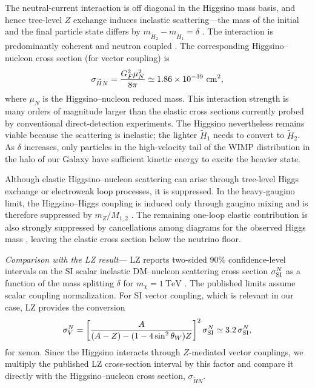 \documentclass[
aps,
prl,
reprint,
superscriptaddress,
nofootinbib,
nobibnotes
]{revtex4-2}
\begin{document}
The neutral-current interaction is off diagonal in the Higgsino mass
basis, and hence tree-level $Z$ exchange induces inelastic scattering---the mass of the initial and the final particle state differs by $m_{\widetilde{H}_2}-m_{\widetilde{H}_1}=\delta$
\cite{Tucker-Smith:2001myb}.
The interaction is predominantly coherent and neutron coupled \cite{Nagata:2014wma,Kowalska:2018toh,Essig:2007az}. 
The corresponding Higgsino--nucleon cross section (for vector coupling) is 
\begin{equation}
    \sigma_{\widetilde H N}
    =
    \frac{G_F^2\mu_N^2}{8\pi}
    \simeq
    1.86\times10^{-39}~{\rm cm}^2 ,
    \label{eq:higgsino_neutron_xsec}
\end{equation}
where $\mu_N$ is the Higgsino--nucleon reduced mass.
This interaction strength is many orders of magnitude larger than the elastic cross sections currently probed by conventional direct-detection experiments. The Higgsino nevertheless remains viable because the scattering is inelastic; the lighter $\widetilde H_1$ needs to convert to $\widetilde H_2$. As $\delta$ increases, only particles in the high-velocity tail  of the WIMP distribution in the halo of our Galaxy have sufficient kinetic energy to excite the heavier state.

Although elastic Higgsino--nucleon scattering can arise through tree-level Higgs exchange or electroweak loop processes, it is suppressed. In the heavy-gaugino limit, the Higgsino--Higgs coupling is induced only through gaugino mixing and is therefore suppressed by $m_Z/M_{1,2}$ \cite{Krall:2017xij}. The remaining one-loop elastic contribution is also strongly suppressed by cancellations among diagrams for the observed Higgs mass \cite{Hisano:2011cs,Hisano:2012wm}, leaving the elastic cross section below the neutrino floor.



\textit{Comparison with the LZ result---}
LZ reports two-sided 90\% confidence-level intervals on the SI scalar inelastic
DM--nucleon scattering cross section $\sigma_{\rm SI}^N$ as a function of the mass splitting
$\delta$ for $m_\chi=1~\mathrm{TeV}$ \cite{LZ:2026}. The published limits assume scalar
coupling normalization. For SI vector coupling, which is relevant in our case, LZ provides the conversion
\begin{equation}
    \sigma_V^N
    =
    \left[
    \frac{A}
    {(A-Z)-(1-4\sin^2\theta_W)Z}
    \right]^2
    \sigma_{\rm SI}^N
    \simeq
    3.2\,\sigma_{\rm SI}^N ,
    \label{eq:vector_conversion}
\end{equation}
for xenon. Since the Higgsino interacts through $Z$-mediated vector
couplings, we multiply the published LZ cross-section interval by this
factor and compare it directly with the Higgsino--nucleon cross section,
$\sigma_{\widetilde H N}$.
\end{document}
